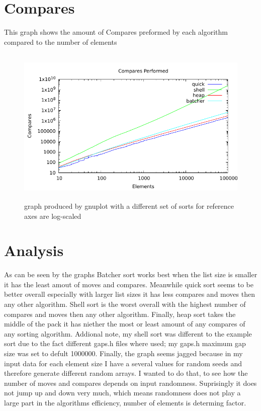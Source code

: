 \documentclass[11pt]{article} %
\begin{document}
\section{Compares}
This graph shows the amount of Compares preformed by each algorithm compared to the number of elements
\begin{figure}[H]
\begin{center}
\includegraphics[height=3in,width=5in]{sorting_comp.pdf}
\caption{graph produced by gnuplot with a different set of sorts for reference axes are log-scaled}
\end{center}
\end{figure}

\section{Analysis}
As can be seen by the graphs Batcher sort works best when the list size is smaller it has the least amout of moves and compares.
Meanwhile quick sort seems to be better overall especially with larger list sizes it has less compares and moves then any other algorithm.
Shell sort is the worst overall with the highest number of compares and moves then any other algorithm. 
Finally, heap sort takes the middle of the pack it has niether the most or least amount of any compares of any sorting algorithm.
Addional note, my shell sort was different to the example sort due to the fact different gaps.h files where used; my gaps.h maximum gap size was set to defult 1000000.
Finally, the graph seems jagged because in my input data for each element size I have a several values for random seeds and therefore generate different random arrays.
I wanted to do that, to see how the number of moves and compares depends on input randomness.
Suprisingly it does not jump up and down very much, which means randomness does not play a large part in the algorithms efficiency, number of elements is determing factor.
\end{document}
